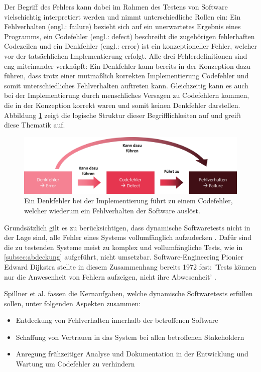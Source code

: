 Der Begriff des Fehlers kann dabei im Rahmen des Testens von Software vielschichtig interpretiert werden und nimmt unterschiedliche Rollen ein: Ein Fehlverhalten (engl.: failure) bezieht sich auf ein unerwartetes Ergebnis eines Programms, ein Codefehler (engl.: defect) beschreibt die zugehörigen fehlerhaften Codezeilen und ein Denkfehler (engl.: error) ist ein konzeptioneller Fehler, welcher vor der tatsächlichen Implementierung erfolgt. Alle drei Fehlerdefinitionen sind eng miteinander verknüpft: Ein Denkfehler kann bereits in der Konzeption dazu führen, dass trotz einer mutmaßlich korrekten Implementierung Codefehler und somit unterschiedliches Fehlverhalten auftreten kann. Gleichzeitig kann es auch bei der Implementierung durch menschliches Versagen zu Codefehlern kommen, die in der Konzeption korrekt waren und somit keinen Denkfehler darstellen. Abbildung \ref{fig:fehler} zeigt die logische Struktur dieser Begrifflichkeiten auf und greift diese Thematik auf.

\begin{figure}[!h]
\centering
\includegraphics[width=0.8\columnwidth]{images/Fehler_Definition.jpg}
\caption{Ein Denkfehler bei der Implementierung führt zu einem Codefehler, welcher wiederum ein Fehlverhalten der Software auslöst.}
\label{fig:fehler}
\end{figure}

Grundsätzlich gilt es zu berücksichtigen, dass dynamische Softwaretests nicht in der Lage sind, alle Fehler eines Systems vollumfänglich aufzudecken \cite[S. 247]{sommerville2012software-engineering}. Dafür sind die zu testenden Systeme meist zu komplex und vollumfängliche Tests, wie in \autoref{subsec:abdeckung} aufgeführt, nicht umsetzbar. Software-Engineering Pionier Edward Dijkstra stellte in diesem Zusammenhang bereits 1972 fest: 'Tests können nur die Anwesenheit von Fehlern aufzeigen, nicht ihre Abwesenheit' \cite{dahl1972structured}.

Spillner et al. \cite[S. 8]{spillner2011software} fassen die Kernaufgaben, welche dynamische Softwaretests erfüllen sollen, unter folgenden Aspekten zusammen:
\begin{itemize}
\item Entdeckung von Fehlverhalten innerhalb der betroffenen Software
\item Schaffung von Vertrauen in das System bei allen betroffenen Stakeholdern
\item Anregung frühzeitiger Analyse und Dokumentation in der Entwicklung und Wartung um Codefehler zu verhindern
\end{itemize}

